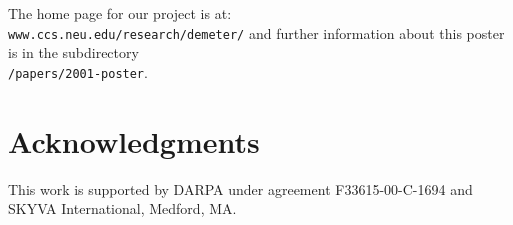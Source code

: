 \documentclass{acm_proc_article-sp}
\begin{document}
The home page for our project is at:\\
\texttt{www.ccs.neu.edu/research/demeter/}
and further information about this poster is 
in the subdirectory\\
\texttt{/papers/2001-poster}.

\section{Acknowledgments}
This work is supported by DARPA under agreement F33615-00-C-1694
and SKYVA International, Medford, MA.



\end{document}
